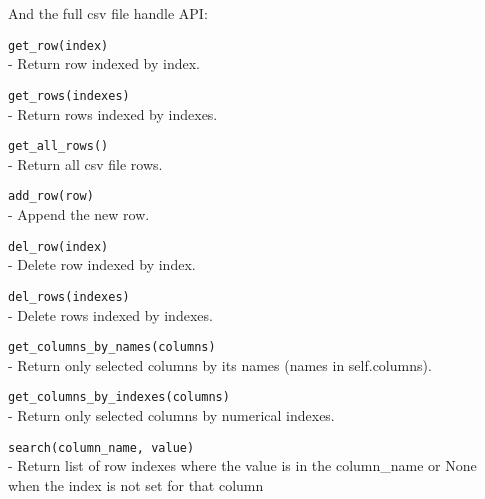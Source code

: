 \documentclass[a4paper]{book}
\begin{document}
And the full csv file handle API:
\begin{api}
  {\tt get\_row(index)}\\
  - Return row indexed by index.

  {\tt get\_rows(indexes)}\\
  - Return rows indexed by indexes.

  {\tt get\_all\_rows()}\\
  - Return all csv file rows.

  {\tt add\_row(row)}\\
  - Append the new row.

  {\tt del\_row(index)}\\
  - Delete row indexed by index.

  {\tt del\_rows(indexes)}\\
  - Delete rows indexed by indexes.

  {\tt get\_columns\_by\_names(columns)}\\
  - Return only selected columns by its names (names in self.columns).

  {\tt get\_columns\_by\_indexes(columns)}\\
  - Return only selected columns by numerical indexes.

  {\tt search(column\_name, value)}\\
  - Return list of row indexes where the value is in the column\_name
  or None when the index is not set for that column
\end{api}




\printindex
\end{document}
